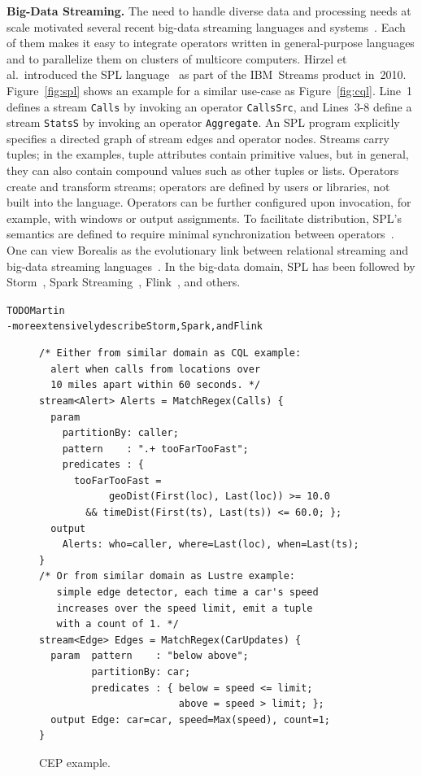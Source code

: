 \textbf{Big-Data Streaming.}
%
The need to handle diverse data and processing needs at scale
motivated several recent big-data streaming languages and
systems~\cite{carbone_et_al_2015,hirzel_schneider_gedik_2017,toshniwal_et_al_2014,zaharia_et_al_2013}.
Each of them makes it easy to integrate operators written in
general-purpose languages and to parallelize them on clusters of
multicore computers. Hirzel et al.\ introduced the SPL
language~\cite{hirzel_schneider_gedik_2017} as part of the IBM~Streams
product in~2010. Figure~\ref{fig:spl} shows an example for a similar
use-case as Figure~\ref{fig:cql}. Line~1 defines a stream
\lstinline{Calls} by invoking an operator \lstinline{CallsSrc}, and
\mbox{Lines 3-8} define a stream \lstinline{StatsS} by invoking an
operator \lstinline{Aggregate}. An SPL program explicitly specifies a
directed graph of stream edges and operator nodes. Streams carry
tuples; in the examples, tuple attributes contain primitive values,
but in general, they can also contain compound values such as other
tuples or lists.  Operators create and transform streams; operators
are defined by users or libraries, not built into the
language. Operators can be further configured upon invocation, for
example, with windows or output assignments. To facilitate
distribution, SPL's semantics are defined to require minimal
synchronization between operators~\cite{soule_et_al_2016}. One can
view Borealis as the evolutionary link between relational streaming
and big-data streaming languages~\cite{abadi_et_al_2005}. In the
big-data domain, SPL has been followed by
Storm~\cite{toshniwal_et_al_2014}, Spark
Streaming~\cite{zaharia_et_al_2013}, Flink~\cite{carbone_et_al_2015},
and others.

\begin{alltt}TODO\scriptsize Martin
- more extensively describe Storm, Spark, and Flink
\end{alltt}

\begin{figure}[!h]
\begin{lstlisting}
/* Either from similar domain as CQL example:
  alert when calls from locations over
  10 miles apart within 60 seconds. */
stream<Alert> Alerts = MatchRegex(Calls) {
  param
    partitionBy: caller;
    pattern    : ".+ tooFarTooFast";
    predicates : {
      tooFarTooFast =
            geoDist(First(loc), Last(loc)) >= 10.0
        && timeDist(First(ts), Last(ts)) <= 60.0; };
  output
    Alerts: who=caller, where=Last(loc), when=Last(ts);
}
/* Or from similar domain as Lustre example:
   simple edge detector, each time a car's speed
   increases over the speed limit, emit a tuple
   with a count of 1. */
stream<Edge> Edges = MatchRegex(CarUpdates) {
  param  pattern    : "below above";
         partitionBy: car;
         predicates : { below = speed <= limit;
                        above = speed > limit; };
  output Edge: car=car, speed=Max(speed), count=1;
}
\end{lstlisting}
\vspace*{-4mm}
\caption{\label{fig:cep}CEP example.}
\end{figure}


